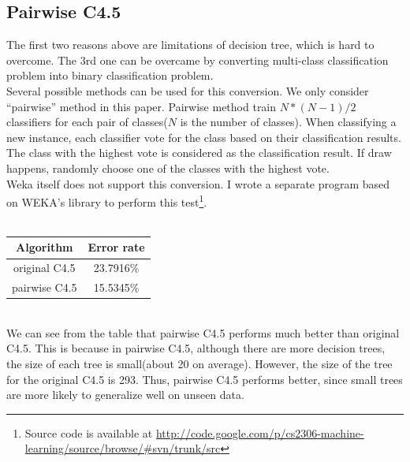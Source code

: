 \documentclass[a4paper,11pt]{article}
\begin{document}
\subsection{Pairwise C4.5}
The first two reasons above are limitations of decision tree, which is hard to overcome. The 3rd one can be overcame by converting multi-class classification problem into binary classification problem.\\
Several possible methods can be used for this conversion. We only consider ``pairwise'' method in this paper. Pairwise method train $N*(N-1)/2$ classifiers for each pair of classes($N$ is the number of classes). When classifying a new instance, each classifier vote for the class based on their classification results. The class with the highest vote is considered as the classification result. If draw happens, randomly choose one of the classes with the highest vote.\\
Weka itself does not support this conversion. I wrote a separate program based on WEKA's library to perform this test\footnote{Source code is available at \url{http://code.google.com/p/cs2306-machine-learning/source/browse/#svn/trunk/src}}.\\
\vspace{0.5cm}\\
\begin{tabular}{c c}
Algorithm	& Error rate\\
\hline \hline
original C4.5	& 23.7916\%\\
pairwise C4.5	& 15.5345\%\\
\end{tabular}
\vspace{0.5cm}\\
We can see from the table that pairwise C4.5 performs much better than original C4.5. This is because in pairwise C4.5, although there are more decision trees, the size of each tree is small(about 20 on average). However, the size of the tree for the original C4.5 is 293. Thus, pairwise C4.5 performs better, since small trees are more likely to generalize well on unseen data.
\end{document}
